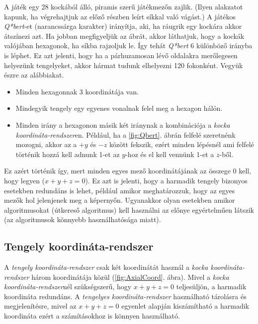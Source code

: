A játék egy $28$ kockából álló, piramis szerű játékmezőn zajlik. (Ilyen alakzatot kapunk, ha végrehajtjuk az előző részben leírt síkkal való vágást.) A játékos \textit{Q*bert}-et (narancssárga karakter) irányítja, aki, ha ráugrik egy kockára akkor átszínezi azt. Ha jobban megfigyeljük az ábrát, akkor láthatjuk, hogy a kockák valójában hexagonok, ha síkba rajzoljuk le. Így tehát \textit{Q*bert} 6 különböző irányba is léphet. Ez azt jelenti, hogy ha a párhuzamosan lévő oldalakra merőlegesen helyezünk tengelyeket, akkor hármat tudunk elhelyezni 120 fokonként. Vegyük észre az alábbiakat.
\begin{itemize}
\item Minden hexagonnak 3 koordinátája van. 
\item Mindegyik tengely egy egyenes vonalnak felel meg a hexagon hálón.
\item Minden irány a hexagonon másik két iránynak a kombinációja a \textit{kocka koordináta-rendszer}en. Például, ha a \ref{fig:Qbert}. ábrán felfelé szeretnénk mozogni, akkor az a $+y$ és $-z$ között fekszik, ezért minden lépésnél ami felfelé történik hozzá kell adnunk 1-et az $y$-hoz és el kell vennünk 1-et a $z$-ből. 
\end{itemize}
Ez azért történik így, mert minden egyes mező koordinátájának az összege $0$ kell, hogy legyen ($x + y + z = 0$). Ez azt is jelenti, hogy a harmadik tengely bizonyos esetekben redundáns is lehet, például amikor meghatározzuk, hogy az egyes mezők hol jelenjenek meg a képernyőn. Ugyanakkor olyan esetekben amikor algoritmusokat (útkereső algoritmus) kell használni az előnye egyértelműen látszik (az algoritmusok könnyebb használhatósága miatt). 

\subsection{Tengely koordináta-rendszer}

A \textit{tengely koordináta-rendszer} csak két koordinátát használ a \textit{kocka koordináta-rendszer} három koordinátája közül (\ref{fig:AxialCoord}. ábra). Mivel a \textit{kocka koordináta-rendszer}nél szükségszerű, hogy  $x + y + z = 0$ teljesüljön, a harmadik koordináta redundáns.  A \textit{tengelyes koordináta-rendszer} használható tárolásra és megjelenítésre, mivel az $x + y + z = 0$ egyenlet alapján kiszámítható a harmadik koordináta ezért a számításokhoz is könnyen használható.


